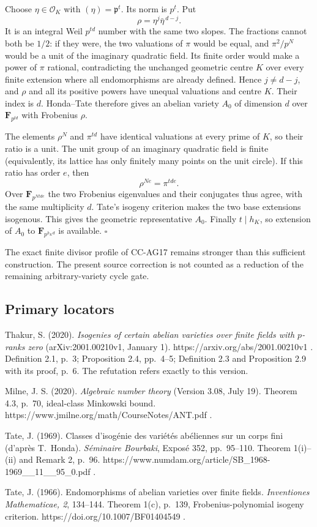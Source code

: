 Choose $\eta\in\mathcal O_K$ with $(\eta)=\mathfrak p^t$.
Its norm is $p^t$. Put
\[
                  \rho=\eta^j\bar\eta^{\,d-j}.
\]
It is an integral Weil $p^{td}$ number with the same two slopes.
The fractions cannot both be $1/2$: if they were, the two valuations
of $\pi$ would be equal, and $\pi^2/p^N$ would be a unit of
the imaginary quadratic field. Its finite order would make a power
of $\pi$ rational, contradicting the unchanged geometric centre
$K$ over every finite extension where all endomorphisms are already
defined. Hence $j\ne d-j$, and $\rho$ and all its positive powers
have unequal valuations and centre $K$. Their index is $d$.
Honda--Tate therefore gives an abelian variety $A_0$ of dimension
$d$ over $\mathbf F_{p^{td}}$ with Frobenius $\rho$.

The elements $\rho^N$ and $\pi^{td}$ have identical valuations
at every prime of $K$, so their ratio is a unit. The unit group of
an imaginary quadratic field is finite (equivalently, its lattice
has only finitely many points on the unit circle). If this ratio
has order $e$, then
\[
                         \rho^{Ne}=\pi^{tde}.
\]
Over $\mathbf F_{p^{Ntde}}$ the two Frobenius eigenvalues and their
conjugates thus agree, with the same multiplicity $d$. Tate's
isogeny criterion makes the two base extensions isogenous. This
gives the geometric representative $A_0$. Finally $t\mid h_K$,
so extension of $A_0$ to $\mathbf F_{p^{h_Kd}}$ is available.
$\square$

The exact finite divisor profile of CC-AG17 remains stronger than
this sufficient construction. The present source correction is not
counted as a reduction of the remaining arbitrary-variety cycle gate.

\subsection{Primary locators}

Thakur, S. (2020). \emph{Isogenies of certain abelian varieties over
finite fields with $p$-ranks zero} (arXiv:2001.00210v1, January 1).
https://arxiv.org/abs/2001.00210v1 . Definition 2.1, p.~3;
Proposition 2.4, pp.~4--5; Definition 2.3 and Proposition 2.9 with
its proof, p.~6. The refutation refers exactly to this version.

Milne, J. S. (2020). \emph{Algebraic number theory} (Version 3.08,
July 19). Theorem 4.3, p.~70, ideal-class Minkowski bound.
https://www.jmilne.org/math/CourseNotes/ANT.pdf .

Tate, J. (1969). Classes d'isog\'enie des vari\'et\'es ab\'eliennes
sur un corps fini (d'apr\`es T.~Honda). \emph{S\'eminaire Bourbaki},
Expos\'e 352, pp.~95--110. Theorem 1(i)--(ii) and Remark 2,
p.~96. https://www.numdam.org/article/SB_1968-1969__11__95_0.pdf .

Tate, J. (1966). Endomorphisms of abelian varieties over finite
fields. \emph{Inventiones Mathematicae, 2}, 134--144.
Theorem 1(c), p.~139, Frobenius-polynomial isogeny criterion.
https://doi.org/10.1007/BF01404549 .
